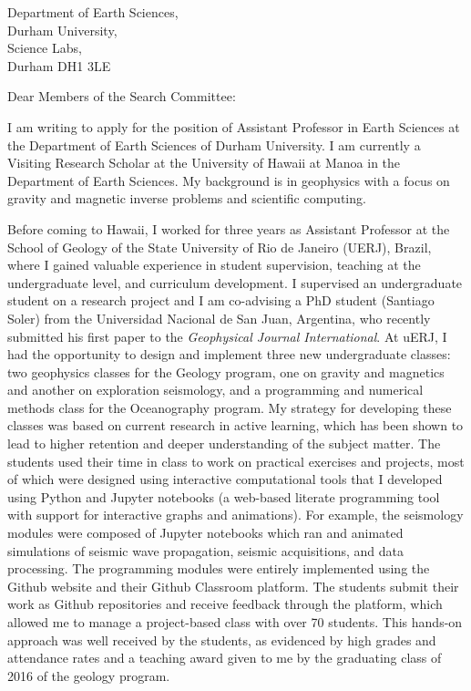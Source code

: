 \documentclass[11pt]{letter}
\begin{document}
\begin{letter}{
        Department of Earth Sciences,  \\
        Durham University, \\
        Science Labs, \\
        Durham DH1 3LE
}
\opening{Dear Members of the Search Committee:}

I am writing to apply for the position of
Assistant Professor in Earth Sciences
at the Department of Earth Sciences of Durham University.
I am currently a Visiting Research Scholar at the University of Hawaii at Manoa in the
Department of Earth Sciences.
My background is in geophysics with a focus on gravity and magnetic inverse problems and
scientific computing.

Before coming to Hawaii, I worked for three years as Assistant Professor at the School
of Geology of the State University of Rio de Janeiro (UERJ), Brazil, where I gained
valuable experience in student supervision, teaching at the undergraduate level, and
curriculum development.
I supervised an undergraduate student on a research project and I am co-advising a PhD
student (Santiago Soler) from the Universidad Nacional de San Juan, Argentina, who
recently submitted his first paper to the \textit{Geophysical Journal International}.
At uERJ, I had the opportunity to design and implement three new undergraduate classes:
two geophysics classes for the Geology program, one on gravity and magnetics and another
on exploration seismology, and a programming and numerical methods class for the
Oceanography program.
My strategy for developing these classes was based on current research in active
learning, which has been shown to lead to higher retention and deeper understanding of
the subject matter.
The students used their time in class to work on practical exercises and projects,
most of which were designed using interactive computational tools that I developed using
Python and Jupyter notebooks (a web-based literate programming tool with support for
interactive graphs and animations).
For example, the seismology modules were composed of Jupyter notebooks which ran and
animated simulations of seismic wave propagation, seismic acquisitions, and data
processing.
The programming modules were entirely implemented using the Github website and their
Github Classroom platform.
The students submit their work as Github repositories and receive feedback through the
platform, which allowed me to manage a project-based class with over 70 students.
This hands-on approach was well received by the students, as evidenced by high
grades and attendance rates and a teaching award given to me by the graduating class of
2016 of the geology program.


\end{letter}
\end{document}
